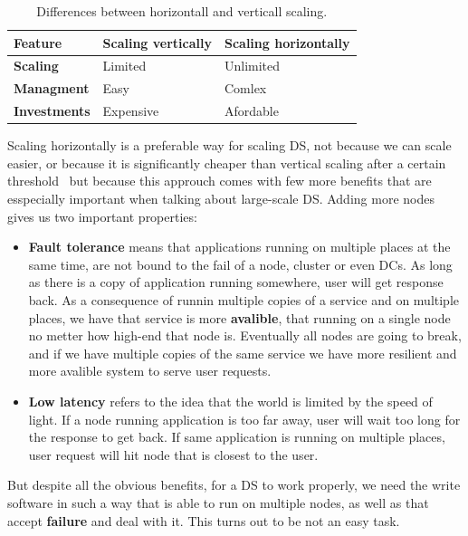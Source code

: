 \begin{table}[h!]
	\begin{center}
		\begin{tabular}{l|l|l}
			\textbf{Feature} & \textbf{Scaling vertically} & \textbf{Scaling horizontally}\\
			\hline
			\textbf{Scaling} & Limited & Unlimited \\
			\textbf{Managment} & Easy & Comlex\\
			\textbf{Investments} & Expensive & Afordable \\
		\end{tabular}
	\end{center}
	\vspace{-0.5cm}
	\caption{Differences between horizontall and verticall scaling.}
	\label{tab:table1}
\end{table}

Scaling horizontally is a preferable way for scaling DS, not because we can scale easier, or because it is significantly cheaper than vertical scaling after a certain threshold~\cite{Bondi00} but because this approuch comes with few more benefits that are esspecially important when talking about large-scale DS. Adding more nodes gives us two important properties: 

\begin{itemize}
	\item \textbf{Fault tolerance} means that applications running on multiple places at the same time, are not bound to the fail of a node, cluster or even DCs. As long as there is a copy of application running somewhere, user will get response back. As a consequence of runnin multiple copies of a service and on multiple places, we have that service is more \textbf{avalible}, that running on a single node no metter how high-end that node is. Eventually all nodes are going to break, and if we have multiple copies of the same service we have more resilient and more avalible system to serve user requests.
	\item \textbf{Low latency} refers to the idea that the world is limited by the speed of light. If a node running application is too far away, user will wait too long for the response to get back. If same application is running on multiple places, user request will hit node that is closest to the user.
\end{itemize}

But despite all the obvious benefits, for a DS to work properly, we need the write software in such a way that is able to run on multiple nodes, as well as that accept \textbf{failure} and deal with it. This turns out to be not an easy task.

